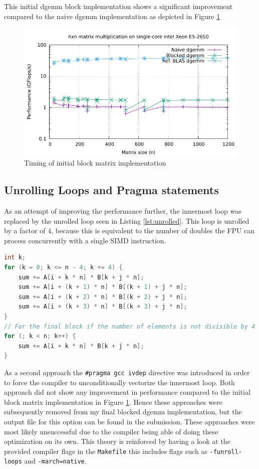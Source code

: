 This initial dgemm block implementation shows a significant improvement compared to the naive dgemm implementation as depicted in Figure \ref{fig:dgemm-0}
\begin{figure}[H]
	\centering
	\includegraphics[width=\textwidth]{../media/timing-36.pdf}
	\caption{Timing of initial block matrix implementation}
	\label{fig:dgemm-0}
\end{figure}

\subsection{Unrolling Loops and Pragma statements}
As an attempt of improving the performance further, the innermost loop was replaced by the unrolled loop seen in Listing \ref{lst:unrolled}.
This loop is unrolled by a factor of 4, because this is equivalent to the number of doubles the FPU can process concurrently with a single SIMD instruction.
\begin{lstlisting}[language=C++, caption=Unrolled loop, label=lst:unrolled]
int k;
for (k = 0; k <= n - 4; k += 4) {
	sum += A[i + k * n] * B[k + j * n];
	sum += A[i + (k + 1) * n] * B[(k + 1) + j * n];
	sum += A[i + (k + 2) * n] * B[(k + 2) + j * n];
	sum += A[i + (k + 3) * n] * B[(k + 3) + j * n];
}
// For the final block if the number of elements is not divisible by 4
for (; k < n; k++) {
	sum += A[i + k * n] * B[k + j * n];
}
\end{lstlisting}
As a second approach the \texttt{\#pragma gcc ivdep} \cite{noauthor_loop-specific_nodate} directive was introduced in order to force the compiler to unconditionally vectorize the innermost loop.
Both approach did not show any improvement in performance compared to the initial block matrix implementation in Figure \ref{fig:dgemm-0}.
Hence these approaches were subsequently removed from my final blocked dgemm implementation, but the output file for this option can be found in the submission.
These approaches were most likely unsuccessful due to the compiler being able of doing these optimization on its own. This theory is reinforced by having a look at the provided compiler flags in the \texttt{Makefile} this includes flags such as \texttt{-funroll-loops} and \texttt{-march=native}.

